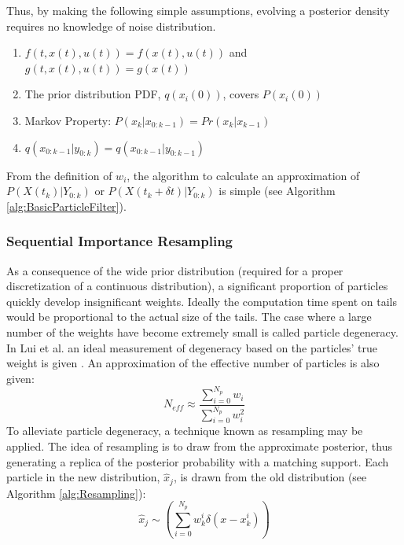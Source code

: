 \documentclass[journal]{./IEEEtran}
\begin{document}
Thus, by making the following simple assumptions, evolving a posterior
density  requires no knowledge of noise distribution.
\begin{enumerate}
\item $f(t, x(t), u(t)) = f(x(t), u(t))$ and $g(t, x(t), u(t)) = g(x(t))$ 
\item The prior distribution PDF, $q(x_i(0))$, covers $P(x_i(0))$
\item Markov Property: $P(x_k | x_{0:k-1}) = Pr(x_k | x_{k-1})$
\item $q(x_{0:k-1} | y_{0:k}) = q(x_{0:k-1} | y_{0:k-1})$
\end{enumerate}

From the definition of $w_i$, the algorithm to calculate
an approximation of $P(X(t_k) | Y_{0:k})$ or $P(X(t_k + \delta t) | Y_{0:k})$
is simple (see Algorithm \autoref{alg:BasicParticleFilter}). 

\subsubsection{Sequential Importance Resampling}
\label{sec:ParticleFilterResampling}
As a consequence of the wide prior distribution 
(required for a proper discretization of a continuous
distribution), a significant proportion of particles quickly
develop insignificant weights. 
Ideally the computation time spent on tails would be proportional to 
the actual size of the tails.  The case where a large number of the 
weights have become extremely small
is called particle degeneracy. In  Lui et al. 
an ideal measurement of degeneracy based on the particles' true 
weight is given \cite{Liu1998b}. An approximation of 
the effective number of particles is also given: 
\begin{equation}
N_{eff} \approx \frac{\sum_{i=0}^{N_p} w_i}{\sum_{i=0}^{N_p} w_i^2}
\label{eq:neff}
\end{equation}
To alleviate particle degeneracy, a technique known as resampling 
may be applied. The idea of resampling is to 
draw from the approximate posterior, thus generating 
a replica of the posterior probability with 
a matching support. Each particle in the new distribution,
$\hat{x}_j$, is drawn from the old distribution 
(see Algorithm \autoref{alg:Resampling}):
\begin{equation}
\hat{x}_j \sim \left(\sum_{i=0}^{N_p} w^i_k\delta(x - x^i_k)\right)
\end{equation}
\end{document}

